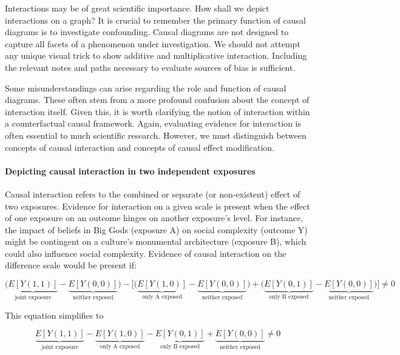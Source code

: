 \documentclass[
  singlecolumn]{article}
\let\oldparagraph\paragraph
\renewcommand{\paragraph}[1]{\oldparagraph{#1}\mbox{}}
\begin{document}
Interactions may be of great scientific importance. How shall we depict
interactions on a graph? It is crucial to remember the primary function
of causal diagrams is to investigate confounding. Causal diagrams are
not designed to capture all facets of a phenomenon under investigation.
We should not attempt any unique visual trick to show additive and
multiplicative interaction. Including the relevant notes and paths
necessary to evaluate sources of bias is sufficient.

Some misunderstandings can arise regarding the role and function of
causal diagrams. These often stem from a more profound confusion about
the concept of interaction itself. Given this, it is worth clarifying
the notion of interaction within a counterfactual causal framework.
Again, evaluating evidence for interaction is often essential to much
scientific research. However, we must distinguish between concepts of
causal interaction and concepts of causal effect modification.

\hypertarget{depicting-causal-interaction-in-two-independent-exposures}{%
\paragraph{\texorpdfstring{\textbf{Depicting causal interaction in two
independent
exposures}}{Depicting causal interaction in two independent exposures}}\label{depicting-causal-interaction-in-two-independent-exposures}}

Causal interaction refers to the combined or separate (or non-existent)
effect of two exposures. Evidence for interaction on a given scale is
present when the effect of one exposure on an outcome hinges on another
exposure's level. For instance, the impact of beliefs in Big Gods
(exposure A) on social complexity (outcome Y) might be contingent on a
culture's monumental architecture (exposure B), which could also
influence social complexity. Evidence of causal interaction on the
difference scale would be present if:

\[\bigg(\underbrace{E[Y(1,1)]}_{\text{joint exposure}} - \underbrace{E[Y(0,0)]}_{\text{neither exposed}}\bigg) - \bigg[ \bigg(\underbrace{E[Y(1,0)]}_{\text{only A exposed}} - \underbrace{E[Y(0,0)]}_{\text{neither exposed}}\bigg) + \bigg(\underbrace{E[Y(0,1)]}_{\text{only B exposed}} - \underbrace{E[Y(0,0)]}_{\text{neither exposed}} \bigg)\bigg] \neq 0 \]

This equation simplifies to

\[ \underbrace{E[Y(1,1)]}_{\text{joint exposure}} - \underbrace{E[Y(1,0)]}_{\text{only A exposed}} - \underbrace{E[Y(0,1)]}_{\text{only B exposed}} + \underbrace{E[Y(0,0)]}_{\text{neither exposed}} \neq 0 \]
\end{document}
